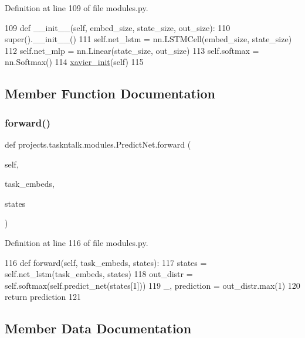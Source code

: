 Definition at line 109 of file modules.\+py.


\begin{DoxyCode}
109     \textcolor{keyword}{def }\_\_init\_\_(self, embed\_size, state\_size, out\_size):
110         super().\_\_init\_\_()
111         self.net\_lstm = nn.LSTMCell(embed\_size, state\_size)
112         self.net\_mlp = nn.Linear(state\_size, out\_size)
113         self.softmax = nn.Softmax()
114         \hyperlink{namespaceprojects_1_1taskntalk_1_1modules_a483197f0d561a3d1ef7d04a2de70e571}{xavier\_init}(self)
115 
\end{DoxyCode}


\subsection{Member Function Documentation}
\mbox{\label{classprojects_1_1taskntalk_1_1modules_1_1PredictNet_a335a65491da122c06266b0be2b46867b}} 
\subsubsection{\texorpdfstring{forward()}{forward()}}
{\footnotesize\ttfamily def projects.\+taskntalk.\+modules.\+Predict\+Net.\+forward (\begin{DoxyParamCaption}\item[{}]{self,  }\item[{}]{task\+\_\+embeds,  }\item[{}]{states }\end{DoxyParamCaption})}



Definition at line 116 of file modules.\+py.


\begin{DoxyCode}
116     \textcolor{keyword}{def }forward(self, task\_embeds, states):
117         states = self.net\_lstm(task\_embeds, states)
118         out\_distr = self.softmax(self.predict\_net(states[1]))
119         \_, prediction = out\_distr.max(1)
120         \textcolor{keywordflow}{return} prediction
121 \end{DoxyCode}


\subsection{Member Data Documentation}
\mbox{\label{classprojects_1_1taskntalk_1_1modules_1_1PredictNet_ad1120f3386bd6612376876ba51804285}} 

